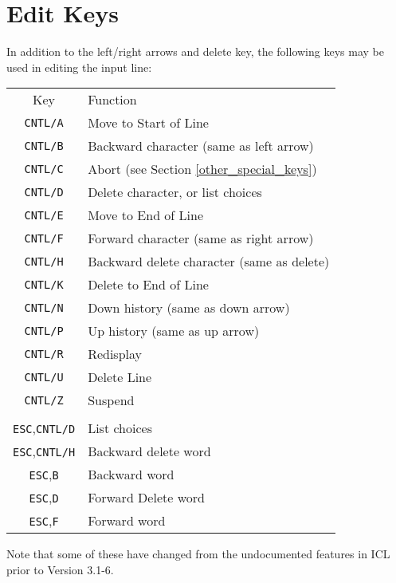 \documentclass[twoside,11pt]{article}
\newcommand{\xlabel}[1]{}
\renewcommand{\_}{\texttt{\symbol{95}}}
\begin{document}
\newpage
\section{\xlabel{edit_keys}\label{edit_keys}Edit Keys}
In addition to the left/right arrows and delete key, the following keys may be
used in editing the input line:

\begin{tabular}{cl}
Key & Function\\
\texttt{CNTL/A} & Move to Start of Line\\
\texttt{CNTL/B} & Backward character (same as left arrow)\\
\texttt{CNTL/C} & Abort (see Section \ref{other_special_keys})\\
\texttt{CNTL/D} & Delete character, or list choices\\
\texttt{CNTL/E} & Move to End of Line\\
\texttt{CNTL/F} & Forward character (same as right arrow)\\
\texttt{CNTL/H} & Backward delete character (same as delete)\\
\texttt{CNTL/K} & Delete to End of Line\\
\texttt{CNTL/N} & Down history (same as down arrow)\\
\texttt{CNTL/P} & Up history (same as up arrow)\\
\texttt{CNTL/R} & Redisplay\\
\texttt{CNTL/U} & Delete Line\\
\texttt{CNTL/Z} & Suspend\\
\\
\texttt{ESC},\texttt{CNTL/D} & List choices\\ 
\texttt{ESC},\texttt{CNTL/H} & Backward delete word\\
\texttt{ESC},\texttt{B} & Backward word\\
\texttt{ESC},\texttt{D} & Forward Delete word\\
\texttt{ESC},\texttt{F} & Forward word\\
\end{tabular}

Note that some of these have changed from the undocumented features in ICL
prior to Version 3.1-6.
\end{document}
